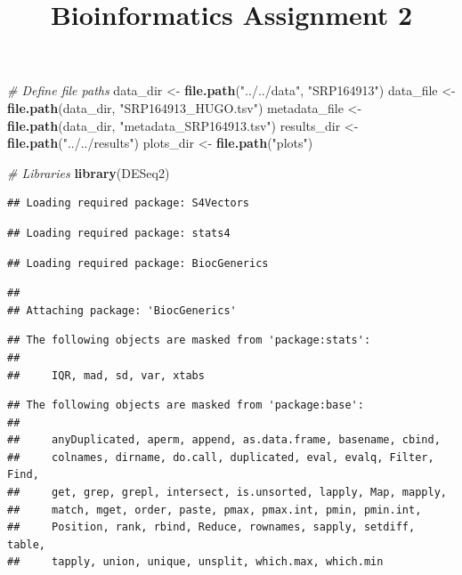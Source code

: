 \documentclass[
]{article}
\title{Bioinformatics Assignment 2}
\author{}
\date{\vspace{-2.5em}}
\newenvironment{Shaded}{\begin{snugshade}}{\end{snugshade}}
\newcommand{\CommentTok}[1]{\textcolor[rgb]{0.56,0.35,0.01}{\textit{#1}}}
\newcommand{\FunctionTok}[1]{\textcolor[rgb]{0.13,0.29,0.53}{\textbf{#1}}}
\newcommand{\NormalTok}[1]{#1}
\newcommand{\OtherTok}[1]{\textcolor[rgb]{0.56,0.35,0.01}{#1}}
\newcommand{\StringTok}[1]{\textcolor[rgb]{0.31,0.60,0.02}{#1}}
\begin{document}
\maketitle

\begin{Shaded}
\begin{Highlighting}[]
\CommentTok{\# Define file paths}
\NormalTok{data\_dir }\OtherTok{\textless{}{-}} \FunctionTok{file.path}\NormalTok{(}\StringTok{"../../data"}\NormalTok{, }\StringTok{"SRP164913"}\NormalTok{)}
\NormalTok{data\_file }\OtherTok{\textless{}{-}} \FunctionTok{file.path}\NormalTok{(data\_dir, }\StringTok{"SRP164913\_HUGO.tsv"}\NormalTok{)}
\NormalTok{metadata\_file }\OtherTok{\textless{}{-}} \FunctionTok{file.path}\NormalTok{(data\_dir, }\StringTok{"metadata\_SRP164913.tsv"}\NormalTok{)}
\NormalTok{results\_dir }\OtherTok{\textless{}{-}} \FunctionTok{file.path}\NormalTok{(}\StringTok{"../../results"}\NormalTok{)}
\NormalTok{plots\_dir }\OtherTok{\textless{}{-}} \FunctionTok{file.path}\NormalTok{(}\StringTok{"plots"}\NormalTok{)}

\CommentTok{\# Libraries}
\FunctionTok{library}\NormalTok{(DESeq2)}
\end{Highlighting}
\end{Shaded}

\begin{verbatim}
## Loading required package: S4Vectors
\end{verbatim}

\begin{verbatim}
## Loading required package: stats4
\end{verbatim}

\begin{verbatim}
## Loading required package: BiocGenerics
\end{verbatim}

\begin{verbatim}
## 
## Attaching package: 'BiocGenerics'
\end{verbatim}

\begin{verbatim}
## The following objects are masked from 'package:stats':
## 
##     IQR, mad, sd, var, xtabs
\end{verbatim}

\begin{verbatim}
## The following objects are masked from 'package:base':
## 
##     anyDuplicated, aperm, append, as.data.frame, basename, cbind,
##     colnames, dirname, do.call, duplicated, eval, evalq, Filter, Find,
##     get, grep, grepl, intersect, is.unsorted, lapply, Map, mapply,
##     match, mget, order, paste, pmax, pmax.int, pmin, pmin.int,
##     Position, rank, rbind, Reduce, rownames, sapply, setdiff, table,
##     tapply, union, unique, unsplit, which.max, which.min
\end{verbatim}
\end{document}
